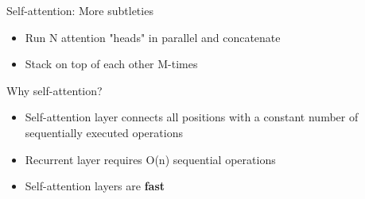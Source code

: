 \documentclass[12pt]{beamer}
\begin{document}
\begin{frame}{Self-attention: More subtleties}
	
	\begin{itemize}
		\item Run N attention "heads" in parallel and concatenate
		\item Stack on top of each other M-times
	\end{itemize}
	
	
	Why self-attention?
	
	\begin{itemize}
		\item Self-attention layer connects all positions with a constant number of sequentially executed operations
		\item Recurrent layer requires O(n) sequential operations
		\item Self-attention layers are \textbf{fast}
	\end{itemize}
	
	\begin{footnotesize}
	\end{footnotesize}

	
\end{frame}
\end{document}
